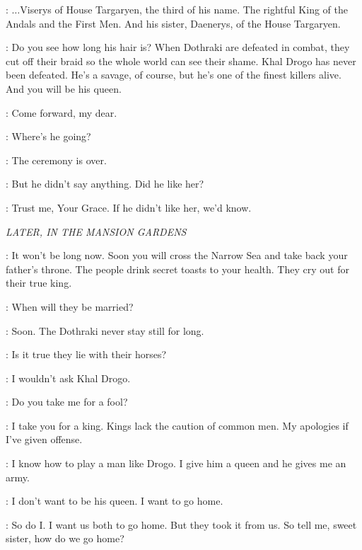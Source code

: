 \ILLYRIO: $\ldots$Viserys of House Targaryen, the third of his name. The rightful King of the Andals and the First Men. And his sister, Daenerys, of the House Targaryen. 

\VISERYS: Do you see how long his hair is? When Dothraki are defeated in combat, they cut off their braid so the whole world can see their shame. Khal Drogo has never been defeated. He's a savage, of course, but he's one of the finest killers alive. And you will be his queen. 

\ILLYRIO: Come forward, my dear. 


\VISERYS: Where's he going? 

\ILLYRIO: The ceremony is over. 

\VISERYS: But he didn't say anything. Did he like her? 

\ILLYRIO: Trust me, Your Grace. If he didn't like her, we'd know. 


\scene

\textit{LATER, IN THE MANSION GARDENS} 


\ILLYRIO: It won't be long now. Soon you will cross the Narrow Sea and take back your father's throne. The people drink secret toasts to your health. They cry out for their true king. 

\VISERYS: When will they be married? 

\ILLYRIO: Soon. The Dothraki never stay still for long. 

\VISERYS: Is it true they lie with their horses? 

\ILLYRIO: I wouldn't ask Khal Drogo. 

\VISERYS: Do you take me for a fool? 

\ILLYRIO: I take you for a king. Kings lack the caution of common men. My apologies if I've given offense. 

\VISERYS: I know how to play a man like Drogo. I give him a queen and he gives me an army. 

\DAENERYS: I don't want to be his queen. I want to go home. 

\VISERYS: So do I. I want us both to go home. But they took it from us. So tell me, sweet sister, how do we go home? 

